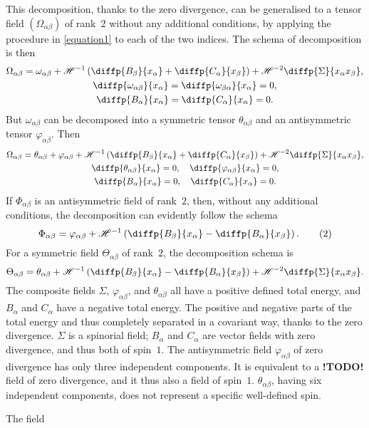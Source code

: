 \documentclass{article}
\newcommand{\HH}{\mathscr{H}}
\newcommand{\todo}{\textbf{ !TODO! }}
\newcommand{\oldpage}[1]{\marginpar{\footnotesize$\Big\vert$ \textit{p.~#1}}}
\begin{document}
This decomposition, thanks to the zero divergence, can be generalised to a tensor field $(\Omega_{\alpha\beta})$ of rank~$2$ without any additional conditions, by applying the procedure in \cref{equation1} to each of the two indices.
The schema of decomposition is then
\begin{gather*}
  \Omega_{\alpha\beta} = \omega_{\alpha\beta} + \HH^{-1}\left(
    \diffp{{B_\beta}}{{x_\alpha}} + \diffp{{C_\alpha}}{{x_\beta}}
  \right) + \HH^{-2}\diffp{\Sigma}{{{x_\alpha}}{{x_\beta}}},
\\\diffp{{\omega_{\alpha\beta}}}{{x_\alpha}} = \diffp{{\omega_{\beta\alpha}}}{{x_\alpha}} = 0,
\\\diffp{{B_\alpha}}{{x_\alpha}} = \diffp{{C_\alpha}}{{x_\alpha}} = 0.
\end{gather*}
But $\omega_{\alpha\beta}$ can be decomposed into a symmetric tensor $\theta_{\alpha\beta}$ and an antisymmetric tensor $\varphi_{\alpha\beta}$.
Then
\oldpage{13-04}
\begin{gather*}
  \Omega_{\alpha\beta} = \theta_{\alpha\beta} + \varphi_{\alpha\beta} + \HH^{-1}\left(
    \diffp{{B_\beta}}{{x_\alpha}} + \diffp{{C_\alpha}}{{x_\beta}}
  \right) + \HH^{-2}\diffp{\Sigma}{{x_\alpha}{x_\beta}},
\\\diffp{{\theta_{\alpha\beta}}}{{x_\alpha}} = 0,
  \quad \diffp{{\varphi_{\alpha\beta}}}{{x_\alpha}} = 0,
\\\diffp{{B_\alpha}}{{x_\alpha}} = 0,
  \quad \diffp{{C_\alpha}}{{x_\alpha}} = 0.
\end{gather*}
If $\Phi_{\alpha\beta}$ is an antisymmetric field of rank~$2$, then, without any additional conditions, the decomposition can evidently follow the schema
\[
\label{equation2}
  \Phi_{\alpha\beta} = \varphi_{\alpha\beta} + \HH^{-1}\left(
    \diffp{{B_\beta}}{{x_\alpha}} - \diffp{{B_\alpha}}{{x_\beta}}
  \right).
  \tag{2}
\]
For a symmetric field $\Theta_{\alpha\beta}$ of rank~$2$, the decomposition schema is
\[
  \Theta_{\alpha\beta} = \theta_{\alpha\beta} + \HH^{-1}\left(
    \diffp{{B_\beta}}{{x_\alpha}} - \diffp{{B_\alpha}}{{x_\beta}}
  \right) + \HH^{-2} \diffp{\Sigma}{{x_\alpha}{x_\beta}}.
\]
The composite fields $\Sigma$, $\varphi_{\alpha\beta}$, and $\theta_{\alpha\beta}$ all have a positive defined total energy, and $B_\alpha$ and $C_\alpha$ have a negative total energy.
The positive and negative parts of the total energy and thus completely separated in a covariant way, thanks to the zero divergence.
$\Sigma$ is a spinorial field; $B_\alpha$ and $C_\alpha$ are vector fields with zero divergence, and thus both of spin~$1$.
The antisymmetric field $\varphi_{\alpha\beta}$ of zero divergence has only three independent components.
It is equivalent to a \todo field of zero divergence, and it thus also a field of spin~$1$.
$\theta_{\alpha\beta}$, having six independent components, does not represent a specific well-defined spin.

\medskip\hrulefill\bigskip

The field
\end{document}
